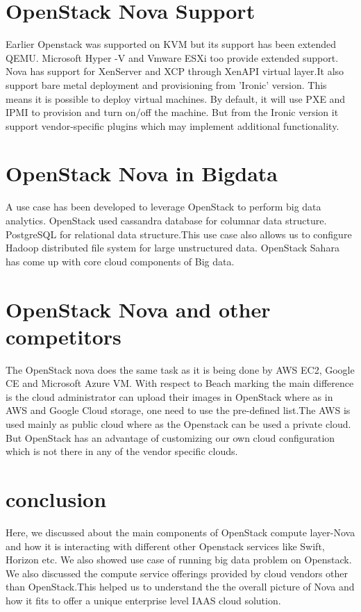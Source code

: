 \documentclass[9pt,twocolumn,twoside]{../../styles/osajnl}
\begin{document}
\section{OpenStack Nova Support}
Earlier Openstack was supported on KVM but its support has been extended QEMU. Microsoft Hyper -V and Vmware ESXi too provide extended support. Nova has support for XenServer and XCP through XenAPI virtual layer.It also support bare metal deployment and provisioning from 'Ironic' version. This means it is possible to deploy virtual machines. By default, it will use PXE and IPMI to provision and turn on/off the machine. But from the Ironic version it support vendor-specific plugins which may implement additional functionality. 


\section{OpenStack Nova in Bigdata}

A use case has been developed to leverage OpenStack to perform big data analytics. OpenStack used cassandra database for columnar data structure. PostgreSQL for relational data structure.This use case also allows us to configure Hadoop distributed file system for large unstructured data. OpenStack Sahara has come up with core cloud components of Big data\cite{www-nova-bigdata}.

\section{OpenStack Nova and other competitors}
 The OpenStack nova does the same task as it is being done by AWS EC2, Google CE and Microsoft Azure VM. With respect to Beach marking the main difference is the cloud administrator can upload their images in OpenStack where as in AWS and Google Cloud storage, one need to use the pre-defined list.The AWS is used mainly as public cloud where as the Openstack can be used a private cloud. But OpenStack has an advantage of customizing our own cloud configuration which is not there in any of the vendor specific clouds.

\section{conclusion}

Here, we discussed about the main components of OpenStack compute layer-Nova and how it is interacting with different other Openstack services like Swift, Horizon etc. We also showed use case of running big data problem on Openstack. We also discussed the compute service offerings provided by cloud vendors other than OpenStack.This helped us to understand the the overall picture of Nova and how it fits to offer a unique enterprise level IAAS cloud solution.


\end{document}
